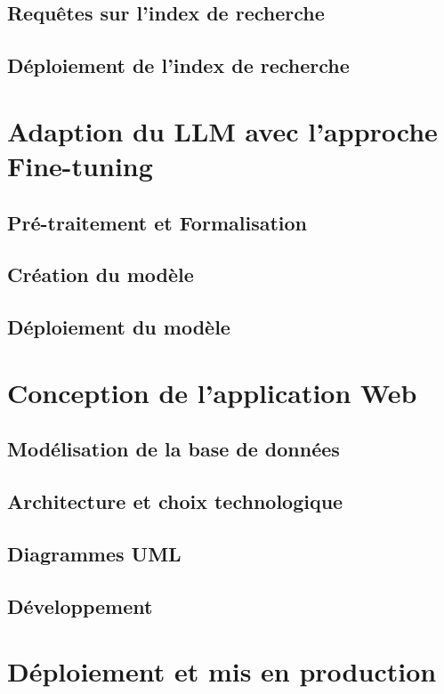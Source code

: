 \subsection{Requêtes sur l'index de recherche}
\subsection{Déploiement de l'index de recherche}


\newpage
\newpage
\section{Adaption du LLM avec l'approche Fine-tuning}
\subsection{Pré-traitement et Formalisation}
\subsection{Création du modèle}
\subsection{Déploiement du modèle}

\section{Conception de l'application Web}
\subsection{Modélisation de la base de données}
\subsection{Architecture et choix technologique}
\subsection{Diagrammes UML}
\subsection{Développement}

\section{Déploiement et mis en production}
